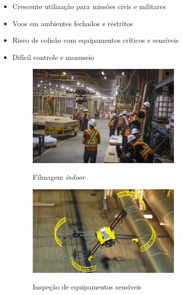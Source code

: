 \documentclass{beamer}
\begin{document}
\begin{frame}[allowframebreaks]
	\frametitle{\insertsection}
	\begin{itemize}
	    \item Crescente utilização para missões civis e militares
	     
	    \item Voos em ambientes fechados e restritos
	     
	    \item Risco de colisão com equipamentos críticos e sensíveis
	    
	    \item Difícil controle e manuseio
	    
	    
	\framebreak
		\vspace{2cm}
		
		\begin{figure}
			\centering
			\includegraphics[keepaspectratio = true,
			width=0.7\textwidth]{img/filmagem_drone.jpg}
			\label{fig:obr2013}
			\caption{Filmagem \textit{indoor}}
		\end{figure}
			
	\framebreak
		\vspace{2cm}
		
		\begin{figure}
			\centering
			\includegraphics[keepaspectratio = true,
			width=0.7\textwidth]{img/Inspection-Drone.jpg}
			\label{fig:obr2013}
			\caption{Inspeção de equipamentos sensíveis}
		\end{figure}
			
	\end{itemize}	
\end{frame}
\end{document}
